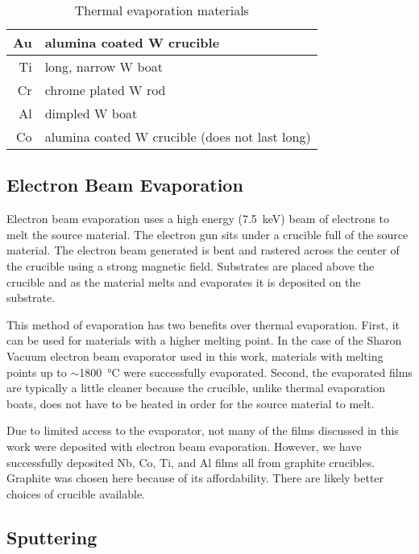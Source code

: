 \begin{table}
	\centering
	\caption{Thermal evaporation materials}
	\begin{tabular}{r | p{60mm}}
		\hline
		Au & alumina coated W crucible \\ \hline
		Ti & long, narrow W boat \\ \hline
		Cr & chrome plated W rod\\ \hline
		Al & dimpled W boat \\ \hline
		Co & alumina coated W crucible (does not last long) \\ \hline
	\end{tabular}
	\label{table:thermal_evap}
\end{table}	

\subsection{Electron Beam Evaporation}
\label{subsec:ebeam_evap}

Electron beam evaporation uses a high energy (\SI{7.5}{\kilo\electronvolt}) beam of electrons to melt the source material. The electron gun sits under a crucible full of the source material. The electron beam generated is bent and rastered across the center of the crucible using a strong magnetic field. Substrates are placed above the crucible and as the material melts and evaporates it is deposited on the substrate.

This method of evaporation has two benefits over thermal evaporation. First, it can be used for materials with a higher melting point. In the case of the Sharon Vacuum electron beam evaporator used in this work, materials with melting points up to $\sim$\SI{1800}{\degreeCelsius} were successfully evaporated. Second, the evaporated films are typically a little cleaner because the crucible, unlike thermal evaporation boats, does not have to be heated in order for the source material to melt. 

Due to limited access to the evaporator, not many of the films discussed in this work were deposited with electron beam evaporation. However, we have successfully deposited Nb, Co, Ti, and Al films all from graphite crucibles. Graphite was chosen here because of its affordability. There are likely better choices of crucible available. 

\subsection{Sputtering}
\label{subsec:sputtering}

